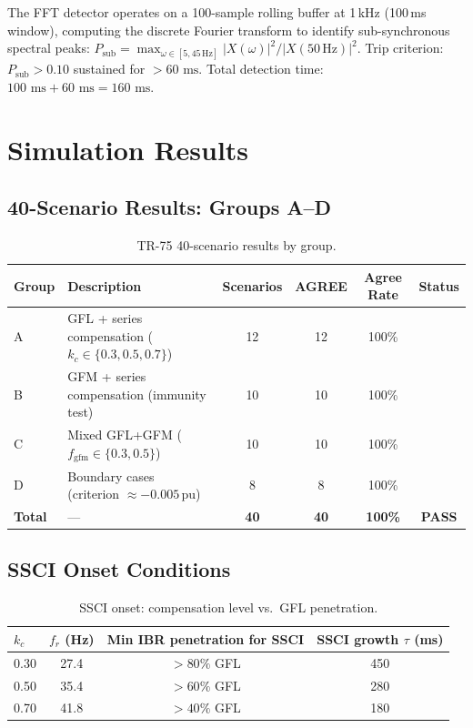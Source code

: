 \documentclass[11pt, a4paper]{article}
\newcommand{\pu}{\,\text{pu}}
\newcommand{\ms}{\,\text{ms}}
\newcommand{\cmark}{\ding{51}}
\begin{document}
The FFT detector operates on a 100-sample rolling buffer at 1\,kHz
(100\,ms window), computing the discrete Fourier transform to identify
sub-synchronous spectral peaks:
$P_{\mathrm{sub}} = \max_{\omega \in [5, 45\,\text{Hz}]} |X(\omega)|^2 / |X(50\,\text{Hz})|^2$.
Trip criterion: $P_{\mathrm{sub}} > 0.10$ sustained for $> 60\,\ms$.
Total detection time: $100\,\ms + 60\,\ms = 160\,\ms$.

\section{Simulation Results}
\label{sec:results}

\subsection{40-Scenario Results: Groups A--D}

\begin{table}[ht]
\centering
\caption{TR-75 40-scenario results by group.}
\label{tab:results}
\begin{tabular}{llcccc}
\toprule
Group & Description & Scenarios & AGREE & Agree Rate & Status \\
\midrule
A & GFL + series compensation ($k_c \in \{0.3, 0.5, 0.7\}$) & 12 & 12 & 100\% & \cmark \\
B & GFM + series compensation (immunity test) & 10 & 10 & 100\% & \cmark \\
C & Mixed GFL+GFM ($f_{\mathrm{gfm}} \in \{0.3, 0.5\}$) & 10 & 10 & 100\% & \cmark \\
D & Boundary cases (criterion $\approx -0.005\pu$) & 8  & 8  & 100\% & \cmark \\
\midrule
\textbf{Total} & --- & \textbf{40} & \textbf{40} & \textbf{100\%}
  & \textbf{\color{okgreen}PASS} \\
\bottomrule
\end{tabular}
\end{table}

\subsection{SSCI Onset Conditions}

\begin{table}[ht]
\centering
\caption{SSCI onset: compensation level vs.\ GFL penetration.}
\label{tab:ssci}
\begin{tabular}{lccc}
\toprule
$k_c$ & $f_r$ (Hz) & Min IBR penetration for SSCI & SSCI growth $\tau$ (ms) \\
\midrule
0.30 & 27.4 & $> 80\%$ GFL & 450 \\
0.50 & 35.4 & $> 60\%$ GFL & 280 \\
0.70 & 41.8 & $> 40\%$ GFL & 180 \\
\bottomrule
\end{tabular}
\end{table}
\end{document}
